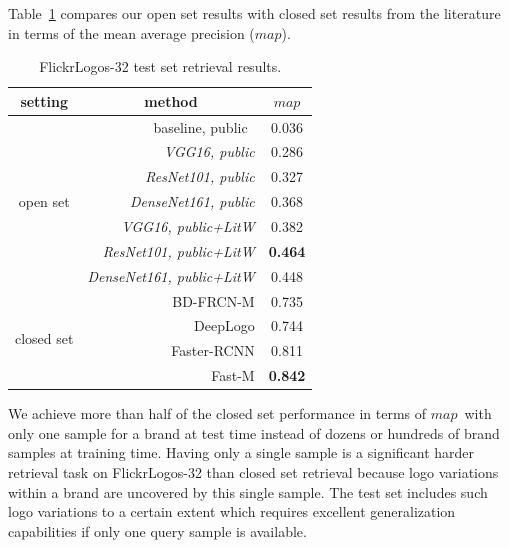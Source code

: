 \documentclass[a4paper,twoside]{article}
\newcommand{\map}{$\mathit{map}$}
\begin{document}
Table~\ref{tab:mapFlickr} compares our open set results with closed set results from the literature in terms of the mean average precision (\map). 
%
\begin{table}[t]
\centering
\begingroup	
\setlength{\tabcolsep}{6pt}
\caption{FlickrLogos-32 test set retrieval results.}
\label{tab:mapFlickr}
\begin{small}
\begin{tabular}{crc}
\textbf{setting} & \multicolumn{1}{c}{\textbf{method}} & \textbf{\map} \bigstrut[b]\\
\hline
\multirow{7}[2]{*}{\begin{sideways}open set\end{sideways}} & baseline, public~\cite{su2016} & 0.036 \bigstrut[t]\\
      & \textit{VGG16, public} & 0.286 \\
      & \textit{ResNet101, public} & 0.327 \\
      & \textit{DenseNet161, public} & 0.368 \\
\cline{2-3}      
      & \textit{VGG16, public+\ac{LitW}} & 0.382 \bigstrut[t]\\
      & \textit{ResNet101, public+\ac{LitW}} & \textbf{0.464} \\
      & \textit{DenseNet161, public+\ac{LitW}} & 0.448  \bigstrut[b]\\      
\hline
\multirow{4}[1]{*}{\begin{sideways}closed set\end{sideways}} & BD-FRCN-M \cite{oliveira2016} & 0.735 \bigstrut[t]\\	
      & DeepLogo \cite{iandola2015} & 0.744 \\ 
      & Faster-RCNN \cite{su2016} & 0.811 \\
      & Fast-M \cite{bao2016} & \textbf{0.842} \\
\end{tabular}%
\end{small}
\endgroup
\end{table}
We achieve more than half of the closed set performance in terms of \map~with only one sample for a brand at test time instead of dozens or hundreds of brand samples at training time. 
Having only a single sample is a significant harder retrieval task on FlickrLogos-32 than closed set retrieval because logo variations within a brand are uncovered by this single sample. The test set includes such logo variations to a certain extent which requires excellent generalization capabilities if only one query sample is available.
\end{document}
